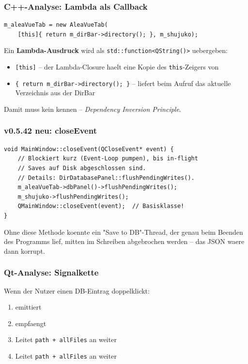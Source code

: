 \subsubsection{C++-Analyse: Lambda als Callback}

\begin{lstlisting}
m_aleaVueTab = new AleaVueTab(
    [this]{ return m_dirBar->directory(); }, m_shujuko);
\end{lstlisting}

Ein \textbf{Lambda-Ausdruck} wird als
\verb|std::function<QString()>| uebergeben:
\begin{itemize}[noitemsep]
  \item \verb|[this]| -- der Lambda-Closure haelt eine
    Kopie des \texttt{this}-Zeigers von 
  \item \verb|{ return m_dirBar->directory(); }| -- liefert
    beim Aufruf das aktuelle Verzeichnis aus der DirBar
\end{itemize}
Damit muss  kein 
kennen -- \emph{Dependency Inversion Principle}.

\subsubsection{v0.5.42 neu: closeEvent}

\begin{lstlisting}[caption={closeEvent: warten auf laufende Saves}]
void MainWindow::closeEvent(QCloseEvent* event) {
    // Blockiert kurz (Event-Loop pumpen), bis in-flight
    // Saves auf Disk abgeschlossen sind.
    // Details: DirDatabasePanel::flushPendingWrites().
    m_aleaVueTab->dbPanel()->flushPendingWrites();
    m_shujuko->flushPendingWrites();
    QMainWindow::closeEvent(event);  // Basisklasse!
}
\end{lstlisting}

Ohne diese Methode koennte ein "Save to DB"-Thread,
der genau beim Beenden des Programms lief, mitten im
Schreiben abgebrochen werden -- das JSON waere dann
korrupt.

\subsubsection{Qt-Analyse: Signalkette}

Wenn der Nutzer einen DB-Eintrag doppelklickt:

\begin{enumerate}[noitemsep]
  \item {} emittiert
  \item {} empfaengt
  \item Leitet \verb|path + allFiles| an
     weiter
  \item Leitet \verb|path + allFiles| an
     weiter
\end{enumerate}


